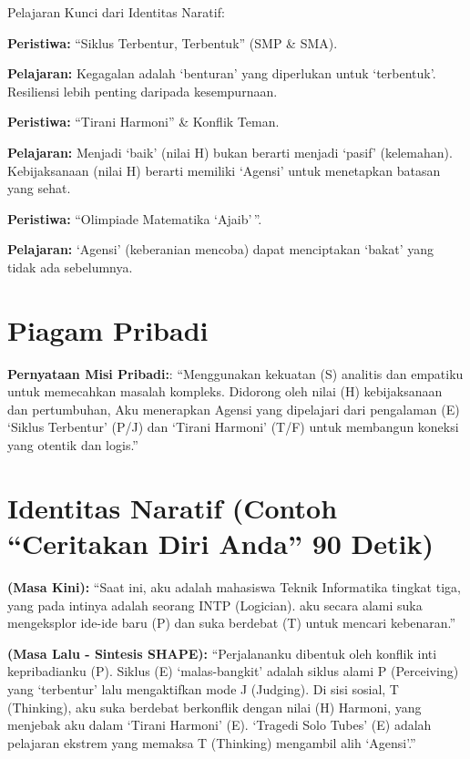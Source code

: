 \documentclass[
  letterpaper,
  DIV=11,
  numbers=noendperiod]{scrreprt}
\begin{document}
Pelajaran Kunci dari Identitas Naratif:

\textbf{Peristiwa:} ``Siklus Terbentur, Terbentuk'' (SMP \& SMA).

\textbf{Pelajaran:} Kegagalan adalah `benturan' yang diperlukan untuk
`terbentuk'. Resiliensi lebih penting daripada kesempurnaan.

\textbf{Peristiwa:} ``Tirani Harmoni'' \& Konflik Teman.

\textbf{Pelajaran:} Menjadi `baik' (nilai H) bukan berarti menjadi
`pasif' (kelemahan). Kebijaksanaan (nilai H) berarti memiliki `Agensi'
untuk menetapkan batasan yang sehat.

\textbf{Peristiwa:} ``Olimpiade Matematika `Ajaib'\,''.

\textbf{Pelajaran:} `Agensi' (keberanian mencoba) dapat menciptakan
`bakat' yang tidak ada sebelumnya.

\section{Piagam Pribadi}\label{piagam-pribadi}

\textbf{Pernyataan Misi Pribadi:}: ``Menggunakan kekuatan (S) analitis
dan empatiku untuk memecahkan masalah kompleks. Didorong oleh nilai (H)
kebijaksanaan dan pertumbuhan, Aku menerapkan Agensi yang dipelajari
dari pengalaman (E) `Siklus Terbentur' (P/J) dan `Tirani Harmoni' (T/F)
untuk membangun koneksi yang otentik dan logis.''

\section{Identitas Naratif (Contoh ``Ceritakan Diri Anda'' 90
Detik)}\label{identitas-naratif-contoh-ceritakan-diri-anda-90-detik}

\textbf{(Masa Kini):} ``Saat ini, aku adalah mahasiswa Teknik
Informatika tingkat tiga, yang pada intinya adalah seorang INTP
(Logician). aku secara alami suka mengeksplor ide-ide baru (P) dan suka
berdebat (T) untuk mencari kebenaran.''

\textbf{(Masa Lalu - Sintesis SHAPE):} ``Perjalananku dibentuk oleh
konflik inti kepribadianku (P). Siklus (E) `malas-bangkit' adalah siklus
alami P (Perceiving) yang `terbentur' lalu mengaktifkan mode J
(Judging). Di sisi sosial, T (Thinking), aku suka berdebat berkonflik
dengan nilai (H) Harmoni, yang menjebak aku dalam `Tirani Harmoni' (E).
`Tragedi Solo Tubes' (E) adalah pelajaran ekstrem yang memaksa T
(Thinking) mengambil alih `Agensi'.''
\end{document}
